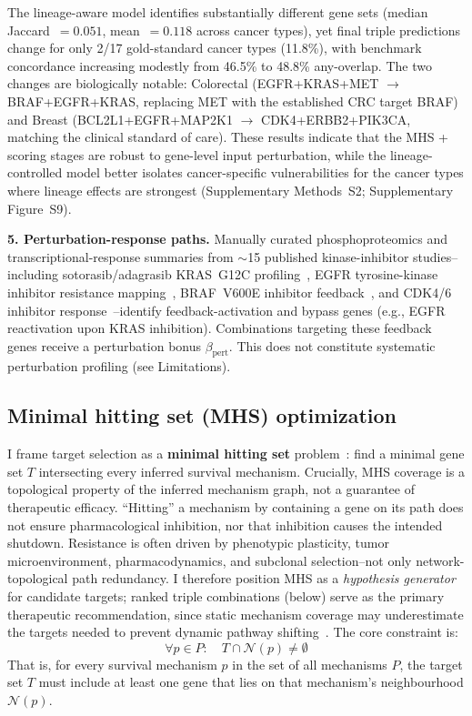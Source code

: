 \documentclass[times, twoside, watermark]{zHenriquesLab-StyleBioRxiv}
\begin{document}
The lineage-aware model identifies substantially different gene sets (median Jaccard~$= 0.051$, mean~$= 0.118$ across cancer types), yet final triple predictions change for only 2/17 gold-standard cancer types (11.8\%), with benchmark concordance increasing modestly from 46.5\% to 48.8\% any-overlap. The two changes are biologically notable: Colorectal (EGFR+KRAS+MET $\to$ BRAF+EGFR+KRAS, replacing MET with the established CRC target BRAF) and Breast (BCL2L1+EGFR+MAP2K1 $\to$ CDK4+ERBB2+PIK3CA, matching the clinical standard of care). These results indicate that the MHS + scoring stages are robust to gene-level input perturbation, while the lineage-controlled model better isolates cancer-specific vulnerabilities for the cancer types where lineage effects are strongest (Supplementary Methods~S2; Supplementary Figure~S9).

\textbf{5. Perturbation-response paths.} Manually curated phosphoproteomics and transcriptional-response summaries from $\sim$15 published kinase-inhibitor studies--including sotorasib/adagrasib KRAS~G12C profiling~\cite{Canon2019,Hallin2020}, EGFR tyrosine-kinase inhibitor resistance mapping~\cite{Bivona2011}, BRAF~V600E inhibitor feedback~\cite{Bollag2010,Lito2012}, and CDK4/6 inhibitor response~\cite{Finn2015}--identify feedback-activation and bypass genes (e.g., EGFR reactivation upon KRAS inhibition). Combinations targeting these feedback genes receive a perturbation bonus $\beta_{\text{pert}}$. This does not constitute systematic perturbation profiling (see Limitations).

\subsection*{Minimal hitting set (MHS) optimization}
I frame target selection as a \textbf{minimal hitting set} problem~\cite{VeraLicona2013,Murakami2017}: find a minimal gene set $T$ intersecting every inferred survival mechanism. Crucially, MHS coverage is a topological property of the inferred mechanism graph, not a guarantee of therapeutic efficacy. ``Hitting'' a mechanism by containing a gene on its path does not ensure pharmacological inhibition, nor that inhibition causes the intended shutdown. Resistance is often driven by phenotypic plasticity, tumor microenvironment, pharmacodynamics, and subclonal selection--not only network-topological path redundancy. I therefore position MHS as a \emph{hypothesis generator} for candidate targets; ranked triple combinations (below) serve as the primary therapeutic recommendation, since static mechanism coverage may underestimate the targets needed to prevent dynamic pathway shifting~\cite{Liaki2025}. The core constraint is:
\begin{equation}
\forall p \in P: \quad T \cap \mathcal{N}(p) \neq \emptyset
\end{equation}
That is, for every survival mechanism $p$ in the set of all mechanisms $P$, the target set $T$ must include at least one gene that lies on that mechanism's neighbourhood $\mathcal{N}(p)$.
\end{document}
